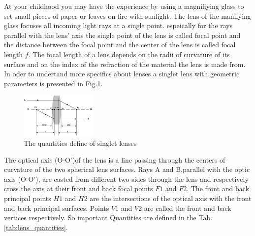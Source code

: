 At your childhood you may have the experience by using a magnifiying glass to set small pieces of paper or leaves on fire with sunlight. The lens of the manifying glass focuses all incoming light rays at a single point. espeically for the rays parallel with the lens' axis the single point of the lens is called focal point and the distance between the focal point and the center of the lens is called focal length $f$.
The focal length of a lens depends on the radii of curvature of its surface and on the index of the refraction of the material the lens is made from. In oder to undertand more specifics about lenses a singlet lens with geometric parameters is presented in Fig.\ref{fig:lens_define}.

\begin{figure}[httbp]
\centering
\includegraphics[width=0.33\textwidth]{bilder/lens_define}
\caption{The quantities define of singlet lenses}
\label{fig:lens_define}
\end{figure}

The optical axis (O-O')of the lens is a line passing through the centers of curvature of the two spherical lens surfaces. 
Rays A and B,parallel with the optic axis (O-O'), are  casted from different two sides through the lens and respectively cross the axis at their front and back focal points $F1$ and $F2$. The front and back principal points $H1$ and $H2$ are the intersections of the optical axis with the front and back principal surfaces. Points $V1$ and $V2$ are called the front and back vertices respectively. So important Quantities are defined in the Tab.\ref{tab:lens_quantities}.


